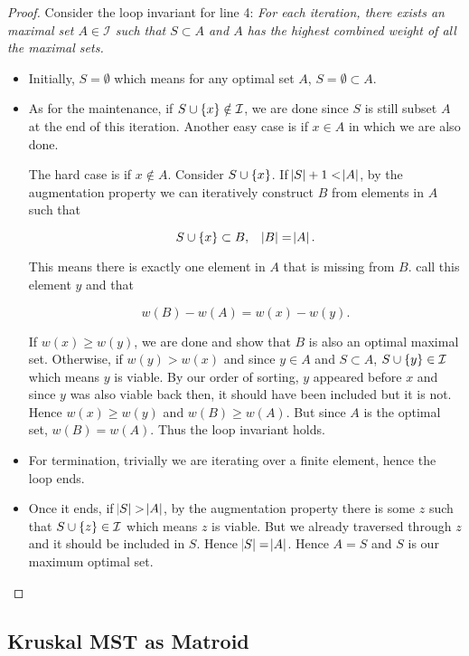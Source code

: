 \begin{proof}
Consider the loop invariant for line 4: 
\textit{For each iteration, there exists an maximal set $A \in \mathcal{I}$ such that $S \subset A$ and $A$ has the highest combined weight of all the maximal sets. }

\begin{itemize}
    \item Initially, $S=\emptyset$ which means for any optimal set $A$, $S=\emptyset\subset A$. 
    \item As for the maintenance, if $S \cup \cbr{x} \notin \mathcal{I}$, we are done since $S$ is still subset $A$ at the end of this iteration. 
    Another easy case is if $x \in A$ in which we are also done. 

    The hard case is if $x \notin A$. 
    Consider $S \cup \cbr{x}$. If $\abs{S}+1<\abs{A}$, by the augmentation property we can iteratively construct $B$ from elements in $A$ such that 

    \[
        S \cup \cbr{x} \subset B, \quad \abs{B}=\abs{A}. 
    \]

    This means there is exactly one element in $A$ that is missing from $B$. call this element $y$ and that 

    \[
        w(B)-w(A)=w(x)-w(y). 
    \]

    If $w(x)\ge w(y)$, we are done and show that $B$ is also an optimal maximal set. 
    Otherwise, if $w(y)>w(x)$ and since $y \in A$ and $S \subset A$, $S \cup \cbr{y} \in \mathcal{I}$ which means $y$ is viable. 
    By our order of sorting, $y$ appeared before $x$ and since $y$ was also viable back then, it should have been included but it is not. 
    Hence $w(x) \ge w(y)$ and $w(B)\ge w(A)$. But since $A$ is the optimal set, $w(B)=w(A)$.
    Thus the loop invariant holds.

    \item For termination, trivially we are iterating over a finite element, hence the loop ends. 

    \item Once it ends, if $\abs{S}>\abs{A}$, by the augmentation property there is some $z$ such that $S \cup \cbr{z} \in \mathcal{I}$ which means $z$ is viable. 
    But we already traversed through $z$ and it should be included in $S$. Hence $\abs{S}=\abs{A}$. Hence $A=S$ and $S$ is our maximum optimal set. 
\end{itemize}
\end{proof}

\subsection{Kruskal MST as Matroid}